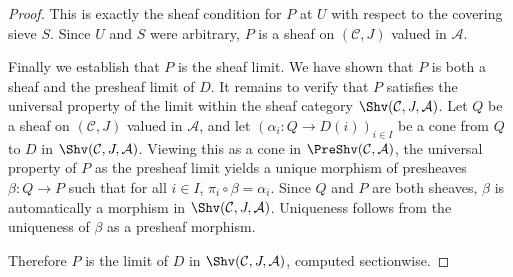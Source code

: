 \begin{proof}
This is exactly the sheaf condition for $P$ at $U$ with respect to the covering sieve $S$. Since $U$ and $S$ were arbitrary, $P$ is a sheaf on $(\mathcal{C}, J)$ valued in $\mathcal{A}$.

Finally we establish that $P$ is the sheaf limit. We have shown that $P$ is both a sheaf and the presheaf limit of $D$. It remains to verify that $P$ satisfies the universal property of the limit within the sheaf category $\Shv(\mathcal{C}, J, \mathcal{A})$. Let $Q$ be a sheaf on $(\mathcal{C}, J)$ valued in $\mathcal{A}$, and let $(\alpha_i: Q \to D(i))_{i \in I}$ be a cone from $Q$ to $D$ in $\Shv(\mathcal{C}, J, \mathcal{A})$. Viewing this as a cone in $\PreShv(\mathcal{C}, \mathcal{A})$, the universal property of $P$ as the presheaf limit yields a unique morphism of presheaves $\beta: Q \to P$ such that for all $i \in I$, $\pi_i \circ \beta = \alpha_i$. Since $Q$ and $P$ are both sheaves, $\beta$ is automatically a morphism in $\Shv(\mathcal{C}, J, \mathcal{A})$. Uniqueness follows from the uniqueness of $\beta$ as a presheaf morphism.

Therefore $P$ is the limit of $D$ in $\Shv(\mathcal{C}, J, \mathcal{A})$, computed sectionwise.
\end{proof}
